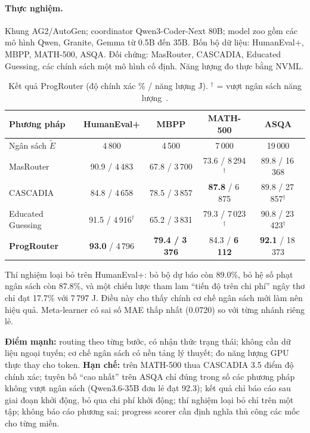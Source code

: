 \paragraph{Thực nghiệm.} Khung AG2/AutoGen; coordinator Qwen3-Coder-Next 80B; model zoo gồm các mô hình Qwen, Granite, Gemma từ 0.5B đến 35B. Bốn bộ dữ liệu: HumanEval+, MBPP, MATH-500, ASQA. Đối chứng: MasRouter, CASCADIA, Educated Guessing, các chính sách một mô hình cố định. Năng lượng đo thực bằng NVML.

\begin{table}[!htbp]
\centering
\small
\caption{Kết quả ProgRouter (độ chính xác \% / năng lượng J). $^{\dagger}$ = vượt ngân sách năng lượng~\cite{p3progrouter}.}
\label{tab:progrouter}
\begin{tabular}{lcccc}
\toprule
\textbf{Phương pháp} & \textbf{HumanEval+} & \textbf{MBPP} & \textbf{MATH-500} & \textbf{ASQA} \\
\midrule
Ngân sách $\tilde E$ & 4\,800 & 4\,500 & 7\,000 & 19\,000 \\
\midrule
MasRouter         & 90.9 / 4\,483 & 67.8 / 3\,700 & 73.6 / 8\,294$^{\dagger}$ & 89.8 / 16\,368 \\
CASCADIA          & 84.8 / 4\,658 & 78.5 / 3\,857 & \textbf{87.8} / 6\,875 & 89.8 / 27\,857$^{\dagger}$ \\
Educated Guessing & 91.5 / 4\,916$^{\dagger}$ & 65.2 / 3\,831 & 79.3 / 7\,023$^{\dagger}$ & 90.8 / 23\,423$^{\dagger}$ \\
\textbf{ProgRouter} & \textbf{93.0} / 4\,796 & \textbf{79.4 / 3\,376} & 84.3 / \textbf{6\,112} & \textbf{92.1} / 18\,373 \\
\bottomrule
\end{tabular}
\end{table}

Thí nghiệm loại bỏ trên HumanEval+: bỏ bộ dự báo còn 89.0\%, bỏ hệ số phạt ngân sách còn 87.8\%, và một chiến lược tham lam ``tiến độ trên chi phí'' ngây thơ chỉ đạt 17.7\% với 7\,797 J. Điều này cho thấy chính cơ chế ngân sách mới làm nên hiệu quả. Meta-learner có sai số MAE thấp nhất (0.0720) so với từng nhánh riêng lẻ.

\begin{nhanxet}
\textbf{Điểm mạnh:} routing theo từng bước, có nhận thức trạng thái; không cần dữ liệu ngoại tuyến; cơ chế ngân sách có nền tảng lý thuyết; đo năng lượng GPU thực thay cho token. \textbf{Hạn chế:} trên MATH-500 thua CASCADIA 3.5 điểm độ chính xác; tuyên bố ``cao nhất'' trên ASQA chỉ đúng trong số các phương pháp không vượt ngân sách (Qwen3.6-35B đơn lẻ đạt 92.3); kết quả chỉ báo cáo sau giai đoạn khởi động, bỏ qua chi phí khởi động; thí nghiệm loại bỏ chỉ trên một tập; không báo cáo phương sai; progress scorer cần định nghĩa thủ công các mốc cho từng miền.
\end{nhanxet}

